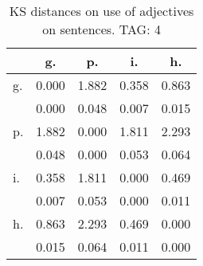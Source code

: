 \begin{table}[h!]
\begin{center}
\begin{tabular}{| l | c | c | c | c |}\hline
 & g. & p. & i. & h. \\\hline
g. & 0.000  & 1.882  & 0.358  & 0.863 \\\hline
 & 0.000  & 0.048  & 0.007  & 0.015 \\\hline
p. & 1.882  & 0.000  & 1.811  & 2.293 \\\hline
 & 0.048  & 0.000  & 0.053  & 0.064 \\\hline
i. & 0.358  & 1.811  & 0.000  & 0.469 \\\hline
 & 0.007  & 0.053  & 0.000  & 0.011 \\\hline
h. & 0.863  & 2.293  & 0.469  & 0.000 \\\hline
 & 0.015  & 0.064  & 0.011  & 0.000 \\\hline
\end{tabular}
\caption{KS distances on use of adjectives on sentences. TAG: 4}
\end{center}
\end{table}